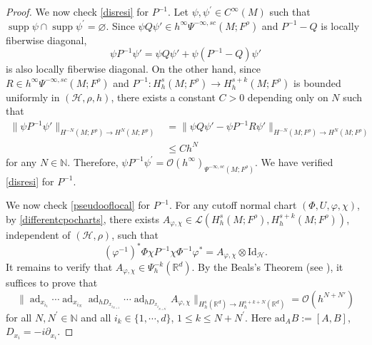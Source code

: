 \documentclass[11pt,oneside,reqno]{amsart}
\newcommand\N{\ensuremath{\mathbb{N}}}
\newcommand\R{\ensuremath{\mathbb{R}}}
\theoremstyle{definition}
\numberwithin{equation}{section}
\theoremstyle{plain}
\begin{document}
\begin{proof}
We now check \eqref{disresi} for $P^{-1}$. Let $\psi, \psi^{\prime} \in C^{\infty}(M)$ such that $\operatorname{supp} \psi \cap \operatorname{supp} \psi^{\prime}=\varnothing$. Since $\psi Q\psi'   \in h^{\infty}\Psi^{-\infty,sc}(M;F^\rho)$ and $P^{-1} -Q$ is locally fiberwise diagonal,
\begin{equation*}
    \psi P^{-1}\psi' = \psi Q\psi' +  \psi (P^{-1} - Q)\psi' 
\end{equation*}
is also locally fiberwise diagonal. On the other hand, since $R\in h^{\infty}\Psi^{-\infty,sc}(M;F^\rho)$ and $P^{-1}:H^{s}_{h}(M;F^\rho)  \rightarrow H^{s+k}_{h}(M;F^{\rho})$ is bounded uniformly in $(\mathcal{H},\rho,h)$, there exists a constant $C>0$ depending only on $N$ such that
\begin{equation*}
\begin{aligned}
     \| \psi P^{-1}\psi' \|_{H^{-N}(M;F^{\rho})\to H^{N}(M;F^{\rho})} & = \| \psi Q\psi' - \psi P^{-1} R \psi' \|_{H^{-N}(M;F^{\rho})\to H^{N}(M;F^{\rho})}  \\
     & \leq Ch^N
\end{aligned}
\end{equation*}
for any $N\in \N$. Therefore, $\psi P^{-1} \psi^{\prime}=\mathcal{O} (h^{\infty} )_{\Psi^{-\infty,sc}(M;F^\rho)}$. We have verified \eqref{disresi} for $P^{-1}$.

We now check \eqref{pseudooflocal} for $P^{-1}$. For any cutoff normal chart $(\Phi, U,\varphi,\chi)$, by \eqref{differentcpocharts}, there exists $A_{\varphi, \chi} \in \mathcal{L}(H^{s}_h(M;F^\rho),H^{s+k}_h(M;F^\rho))$, independent of $(\mathcal{H},\rho)$, such that
\begin{equation}\label{P-1A}
(\varphi^{-1})^*\Phi \chi P^{-1} \chi \Phi^{-1} \varphi^*=A_{\varphi,\chi}\otimes \mathrm{Id}_{\mathcal{H}}.
\end{equation}
It remains to verify that $A_{\varphi,\chi}\in \Psi^{-k}_{h}(\R^d)$. By the Beals's Theorem (see \cite[Theorem 9.12]{zworski2012semiclassicalanalysis}), it suffices to prove that
\begin{equation}\label{esti1ad}
    \big\|\operatorname{ad}_{x_{i_1}} \cdots \operatorname{ad}_{x_{i_N}} \operatorname{ad}_{hD_{x_{i_{N+1}}}} \cdots \operatorname{ad}_{hD_{x_{i_{N+N^\prime}}}} A_{\varphi,\chi}\big\|_{H_h^{s} (\mathbb{R}^d ) \rightarrow H_h^{s+k+N} (\mathbb{R}^d)}=\mathcal{O} (h^{N+N'})
\end{equation}
for all $N, N^{\prime} \in \mathbb{N}$ and all $i_k \in\{1, \cdots, d\}$, $1 \leq k \leq N+N^{\prime}$. Here $\mathrm{ad}_{A}B:=[A,B]$, $D_{x_{i}}=-i\partial_{x_i}$.


\end{proof}
\end{document}
